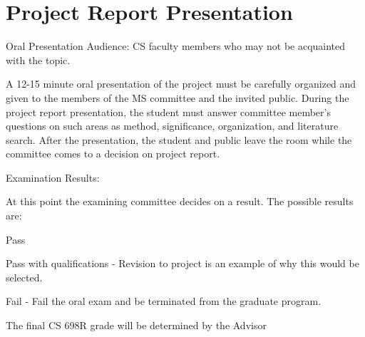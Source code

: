 \documentclass[ms,electronic,oneside,twosidetoc,letterpaper,chaptercenter,parttop]{byumsphd}
\begin{document}
\section{Project Report Presentation }

Oral Presentation Audience: CS faculty members who may not be acquainted with the topic.

A 12-15 minute oral presentation of the project must be carefully organized and given to the members of the MS committee and the invited public. During the project report presentation, the student must answer committee member's questions on such areas as method, significance, organization, and literature search. After the presentation, the student and public leave the room while the committee comes to a decision on project report. 
 

Examination Results:

At this point the examining committee decides on a result. The possible results are:

Pass

Pass with qualifications - Revision to project is an example of why this would be selected.

Fail - Fail the oral exam and be terminated from the graduate program.

The final CS 698R grade will be determined by the Advisor



\end{document}
